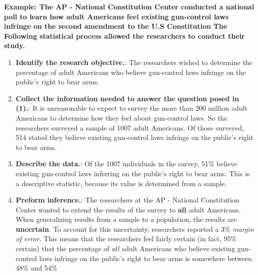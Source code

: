 \documentclass{report}
\begin{document}
        \bigbreak \noindent 
        \begin{mdframed}
          \textbf{Example: The AP - National Constitution Center conducted a national poll to learn how adult Americans feel existing gun-control laws infringe on the second amendment to the U.S Constitution}
          \bigbreak \noindent 
          \textbf{The Following statistical process allowed the researchers to conduct their study.}
          \begin{enumerate}
              \item \textbf{Identify the research objective.}: The researchers wished to determine the percentage of adult Americans who believe gun-control laws infringe on the public's right to bear arms.
            \item \textbf{Collect the information needed to answer the question posed in (1).}: It is unreasonable to expect to survey the more than 200 million adult Americans to determine how they feel about gun-control laws. So the researchers surveyed a sample of 1007 adult Americans. Of those surveyed, 514 stated they believe existing gun-control laws infringe on the public's right to bear arms.
            \item \textbf{Describe the data.}: Of the 1007 individuals in the survey, 51\% believe existing gun-control laws inferring on the public's right to bear arms. This is a descriptive statistic, because its value is determined from a sample.
            \item \textbf{Preform inference.}: The researchers at the AP - National Constitution Center wanted to extend the results of the survey to \textbf{all} adult Americans. When generalizing results from a sample to a population, the results are \textbf{uncertain}. To account for this uncertainty, researchers reported a 3\% \textit{margin of error.} This means that the researchers feel fairly certain (in fact, 95\% certain) that the percentage of \textit{all} adult Americans who believe existing gun-control laws infringe on the public's right to bear arms is somewhere between 48\% and 54\%

          \end{enumerate}
          
        \end{mdframed}
\end{document}
